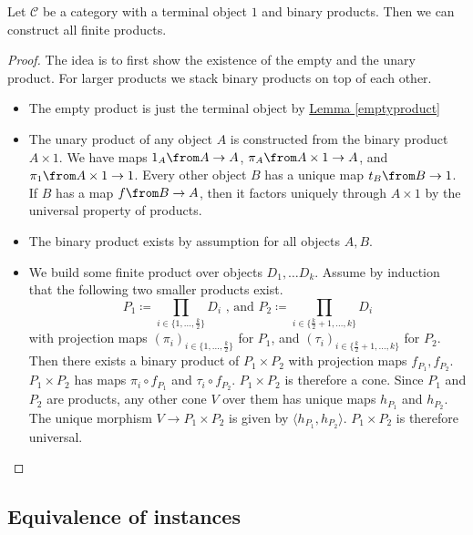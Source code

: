 \begin{lemma}
  \label{finiteproducts}
  Let $\mathscr C$ be a category with a terminal object $1$ and binary products.
  Then we can construct all finite products.
\end{lemma}
\begin{proof}
  The idea is to first show the existence of the empty and the unary product.
  For larger products we stack binary products on top of each other.
  \begin{itemize}
  \item The empty product is just the terminal object by
    \hyperref[emptyproduct]{Lemma \ref*{emptyproduct}}
  \item The unary product of any object $A$ is constructed from the binary product
    $A \times 1$.
    We have maps $1_A \from A \to A$, $\pi_A \from A \times 1 \to A$, and $\pi_1 \from A \times 1 \to 1$.
    Every other object $B$ has a unique map $t_B \from B \to 1$. If $B$ has a map $f \from B \to A$, then
    it factors uniquely through $A \times 1$ by the universal property of products.
  \item The binary product exists by assumption for all objects $A, B$.
  \item We build some finite product over objects $D_1, \dots D_k$.
    Assume by induction that the following two smaller products exist.
    \[ P_1 \coloneqq \displaystyle \prod_{i \in \{1, \dots, \frac{k}{2} \} } D_i \text{ , and } P_2 \coloneqq \displaystyle \prod_{i \in \{\frac{k}{2} + 1, \dots, k\} } D_i \]
    with projection maps $(\pi_i)_{i \in \{1, \dots, \frac{k}{2} \} }$ for $P_1$, and $(\tau_i)_{i \in \{\frac{k}{2}+1, \dots, k\} }$ for $P_2$.
    Then there exists a binary product of $P_1 \times P_2$ with projection maps $f_{P_1}, f_{P_2}$.
    $P_1 \times P_2$ has maps $\pi_i \circ f_{P_1}$ and $\tau_i \circ f_{P_2}$.
    $P_1 \times P_2$ is therefore a cone.
    Since $P_1$ and $P_2$ are products, any other cone $V$ over them has unique maps $h_{P_1}$ and $h_{P_2}$.
    The unique morphism $V \rightarrow P_1 \times P_2$ is given by $\langle h_{P_1}, h_{P_2} \rangle$.
    $P_1 \times P_2$ is therefore universal.
  \end{itemize}
\end{proof}

\subsection{Equivalence of instances}
\label{equiinstance}

